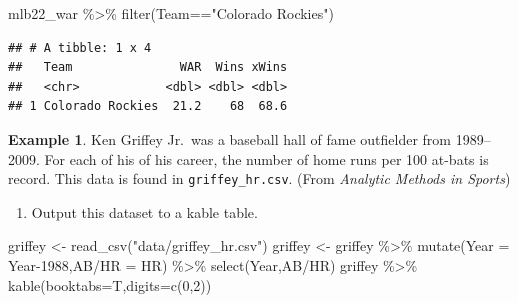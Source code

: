 \documentclass[
  11pt,
]{book}
\newenvironment{Shaded}{\begin{snugshade}}{\end{snugshade}}
\newcommand{\AttributeTok}[1]{\textcolor[rgb]{0.77,0.63,0.00}{#1}}
\newcommand{\DecValTok}[1]{\textcolor[rgb]{0.00,0.00,0.81}{#1}}
\newcommand{\FunctionTok}[1]{\textcolor[rgb]{0.00,0.00,0.00}{#1}}
\newcommand{\NormalTok}[1]{#1}
\newcommand{\OtherTok}[1]{\textcolor[rgb]{0.56,0.35,0.01}{#1}}
\newcommand{\SpecialCharTok}[1]{\textcolor[rgb]{0.00,0.00,0.00}{#1}}
\newcommand{\StringTok}[1]{\textcolor[rgb]{0.31,0.60,0.02}{#1}}
\providecommand{\tightlist}{%
  \setlength{\itemsep}{0pt}\setlength{\parskip}{0pt}}
\theoremstyle{definition}
\theoremstyle{definition}
\newtheorem{example}{Example}[chapter]
\theoremstyle{definition}
\theoremstyle{definition}
\theoremstyle{remark}
\begin{document}
\begin{Shaded}
\begin{Highlighting}[]
\NormalTok{mlb22\_war }\SpecialCharTok{\%\textgreater{}\%} \FunctionTok{filter}\NormalTok{(Team}\SpecialCharTok{==}\StringTok{"Colorado Rockies"}\NormalTok{)}
\end{Highlighting}
\end{Shaded}

\begin{verbatim}
## # A tibble: 1 x 4
##   Team               WAR  Wins xWins
##   <chr>            <dbl> <dbl> <dbl>
## 1 Colorado Rockies  21.2    68  68.6
\end{verbatim}

\newpage

\begin{example}
Ken Griffey Jr.~was a baseball hall of fame outfielder from 1989--2009. For each of his of his career, the number of home runs per 100 at-bats is record. This data is found in \texttt{griffey\_hr.csv}. (From \textit{Analytic Methods in Sports})
\end{example}

\begin{enumerate}
\def\labelenumi{(\alph{enumi})}
\tightlist
\item
  Output this dataset to a kable table.
\end{enumerate}

\begin{Shaded}
\begin{Highlighting}[]
\NormalTok{griffey }\OtherTok{\textless{}{-}} \FunctionTok{read\_csv}\NormalTok{(}\StringTok{"data/griffey\_hr.csv"}\NormalTok{)}
\NormalTok{griffey }\OtherTok{\textless{}{-}}\NormalTok{ griffey }\SpecialCharTok{\%\textgreater{}\%} \FunctionTok{mutate}\NormalTok{(}\AttributeTok{Year =}\NormalTok{ Year}\DecValTok{{-}1988}\NormalTok{,}\StringTok{\textasciigrave{}}\AttributeTok{AB/HR}\StringTok{\textasciigrave{}} \OtherTok{=}\NormalTok{ HR) }\SpecialCharTok{\%\textgreater{}\%} \FunctionTok{select}\NormalTok{(Year,}\StringTok{\textasciigrave{}}\AttributeTok{AB/HR}\StringTok{\textasciigrave{}}\NormalTok{)}
\NormalTok{griffey }\SpecialCharTok{\%\textgreater{}\%} \FunctionTok{kable}\NormalTok{(}\AttributeTok{booktabs=}\NormalTok{T,}\AttributeTok{digits=}\FunctionTok{c}\NormalTok{(}\DecValTok{0}\NormalTok{,}\DecValTok{2}\NormalTok{))}
\end{Highlighting}
\end{Shaded}
\end{document}

